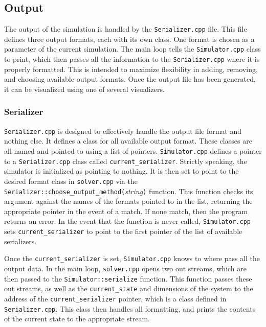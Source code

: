\documentclass[a4paper,11pt]{article}
\begin{document}
\subsection{Output}\label{output}

The output of the simulation is handled by the \texttt{Serializer.cpp} file.  This file defines three output formats, each with its own class.  One format is chosen as a parameter of the current simulation.  The main loop tells the \texttt{Simulator.cpp} class to print, which then passes all the information to the \texttt{Serializer.cpp} where it is properly formatted.   This is intended to maximize flexibility in adding, removing, and choosing available output formats.  Once the output file has been generated, it can be visualized using one of several visualizers.

\subsubsection{Serializer}

\texttt{Serializer.cpp} is designed to effectively handle the output file format and nothing else.  It defines a class for all available output format.  These classes are all named and pointed to using a list of pointers.  \texttt{Simulator.cpp} defines a pointer to a \texttt{Serializer.cpp} class called \texttt{current\_serializer}.  Strictly speaking, the simulator is initialized as pointing to nothing.  It is then set to point to the desired format class in \texttt{solver.cpp} via the \texttt{Serializer::choose\_output\_method(}\emph{string}\texttt{)} function.  This function checks its argument against the names of the formats pointed to in the list, returning the appropriate pointer in the event of a match.  If none match, then the program returns an error.  In the event that the function is never called, \texttt{Simulator.cpp} sets \texttt{current\_serializer} to point to the first pointer of the list of available serializers.  

Once the  \texttt{current\_serializer} is set, \texttt{Simulator.cpp}  knows to where pass all the output data.  In the main loop, \texttt{solver.cpp}  opens two out streams, which are then passed to the \texttt{Simulator::serialize} function.  This function passes these out streams, as well as the \texttt{current\_state} and dimensions of the system to the address of the \texttt{current\_serializer} pointer, which is a class defined in \texttt{Serializer.cpp}.  This class then handles all formatting, and prints the contents of the current state to the appropriate stream.
\end{document}
